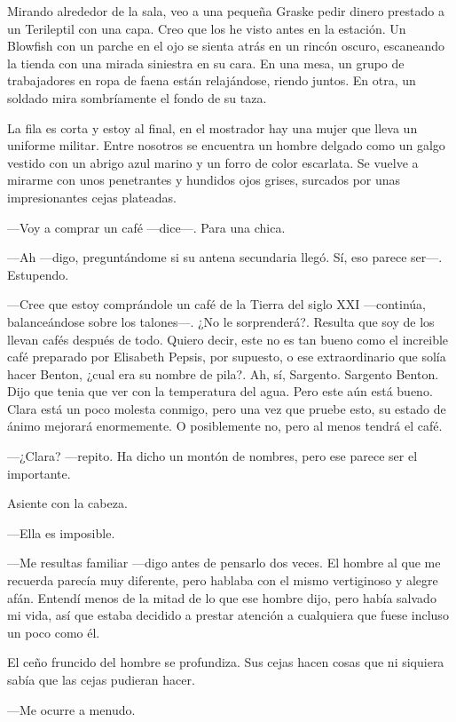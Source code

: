 Mirando alrededor de la sala, veo a una pequeña Graske pedir dinero
prestado a un Terileptil con una capa. Creo que los he visto antes en la
estación. Un Blowfish con un parche en el ojo se sienta atrás en un
rincón oscuro, escaneando la tienda con una mirada siniestra en su
cara. En una mesa, un grupo de trabajadores en ropa de faena están
relajándose, riendo juntos. En otra, un soldado mira sombríamente el
fondo de su taza.

La fila es corta y estoy al final, en el mostrador hay una mujer que
lleva un uniforme militar. Entre nosotros se encuentra un hombre delgado
como un galgo vestido con un abrigo azul marino y un forro de color
escarlata. Se vuelve a mirarme con unos penetrantes y hundidos ojos
grises, surcados por unas impresionantes cejas plateadas.

---Voy a comprar un café ---dice---. Para una chica.

---Ah ---digo, preguntándome si su antena secundaria llegó. Sí, eso
parece ser---. Estupendo.

---Cree que estoy comprándole un café de la Tierra del siglo XXI
---continúa, balanceándose sobre los talones---. ¿No le
sorprenderá?. Resulta que soy de los llevan cafés después de
todo. Quiero decir, este no es tan bueno como el increible café
preparado por Elisabeth Pepsis, por supuesto, o ese extraordinario que
solía hacer Benton, ¿cual era su nombre de pila?. Ah, sí,
Sargento. Sargento Benton. Dijo que tenia que ver con la temperatura del
agua. Pero este aún está bueno. Clara está un poco molesta conmigo, pero
una vez que pruebe esto, su estado de ánimo mejorará enormemente. O
posiblemente no, pero al menos tendrá el café.

---¿Clara? ---repito. Ha dicho un montón de nombres, pero ese parece ser
el importante.

Asiente con la cabeza. 

---Ella es imposible.

---Me resultas familiar ---digo antes de pensarlo dos veces. El hombre
al que me recuerda parecía muy diferente, pero hablaba con el mismo
vertiginoso y alegre afán. Entendí menos de la mitad de lo que ese
hombre dijo, pero había salvado mi vida, así que estaba decidido a
prestar atención a cualquiera que fuese incluso un poco como él.

El ceño fruncido del hombre se profundiza. Sus cejas hacen cosas que ni
siquiera sabía que las cejas pudieran hacer. 

---Me ocurre a menudo.

